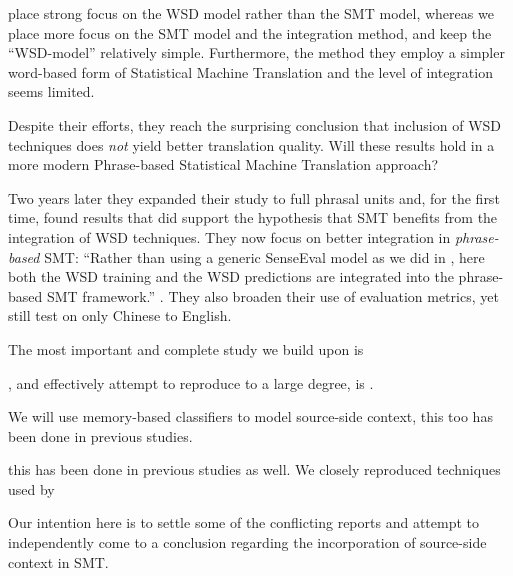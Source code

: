 \documentclass[11pt]{article}
\begin{document}
\cite{CarpuatWu05} place strong focus on the WSD model rather than the SMT
model, whereas we place more focus on the SMT model and the integration method,
and keep the ``WSD-model'' relatively simple. Furthermore, the method they
employ a simpler word-based form of Statistical Machine Translation and the
level of integration seems limited.

Despite their efforts, they reach the surprising conclusion that inclusion of
WSD techniques does \emph{not} yield better translation quality. Will these
results hold in a more modern Phrase-based Statistical Machine Translation
approach?

Two years later they expanded their study to full phrasal units
\citep{CarpuatWu07} and, for the first time, found results that did support the
hypothesis that SMT benefits from the integration of WSD techniques. They now
focus on better integration in \emph{phrase-based} SMT: ``Rather than using a
generic SenseEval model as we did in \cite{CarpuatWu05}, here both the WSD
training and the WSD predictions are integrated into the phrase-based SMT
framework.'' \citep{CarpuatWu07}. They also broaden their use of evaluation
metrics, yet still test on only Chinese to English.

The most important and complete study we build upon is \cite{}

, and effectively attempt to reproduce to a large degree, is \cite{}.



We will use memory-based classifiers to model source-side context, this too has been done in previous studies.

this has been done in previous studies as well. We closely reproduced techniques used by 







Our intention here is to settle some of the conflicting reports and attempt to independently come to a conclusion regarding the incorporation of source-side context in SMT.


\end{document}
